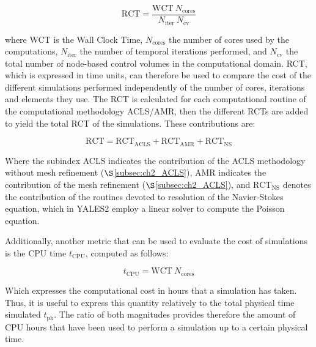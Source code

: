 \begin{equation}
\mathrm{RCT} = \frac{\mathrm{WCT} ~ N_\mathrm{cores}}{N_\mathrm{iter}~N_\mathrm{cv}}
\end{equation}

where WCT is the Wall Clock Time, $N_\mathrm{cores}$ the number of cores used by the computations, $N_\mathrm{iter}$ the number of temporal iterations performed, and $N_\mathrm{cv}$ the total number of node-based control volumes in the computational domain. RCT, which is expressed in time units, can therefore be used to compare the cost of the different simulations performed independently of the number of cores, iterations and elements they use. The RCT is calculated for each computational routine of the computational methodology ACLS/AMR, then the different RCTs are added to yield the total RCT of the simulations. These contributions are:

\begin{equation}
\mathrm{RCT} = \mathrm{RCT}_\mathrm{ACLS} + \mathrm{RCT}_\mathrm{AMR} + \mathrm{RCT}_\mathrm{NS}
\end{equation}

Where the subindex ACLS indicates the contribution of the ACLS methodology without mesh refinement ($\S$\ref{subsec:ch2_ACLS}), AMR indicates the contribution of the mesh refinement ($\S$\ref{subsec:ch2_ACLS}), and $\mathrm{RCT}_\mathrm{NS}$ denotes the contribution of the routines devoted to resolution of the Navier-Stokes equation, which in YALES2 employ a linear solver to compute the Poisson equation.

Additionally, another metric that can be used to evaluate the cost of simulations is the CPU time $t_\mathrm{CPU}$, computed as follows:

\begin{equation}
t_\mathrm{CPU} = \mathrm{WCT} ~ N_\mathrm{cores}
\end{equation}

Which expresses the computational cost in hours that a simulation has taken. Thus, it is useful to express this quantity relatively to the total physical time simulated $t_\mathrm{ph}$. The ratio of both magnitudes provides therefore the amount of CPU hours that have been used to perform a simulation up to a certain physical time.

